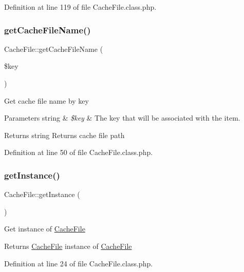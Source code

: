 Definition at line 119 of file Cache\+File.\+class.\+php.

\hypertarget{classCacheFile_a15ca23dea98604dc2e6d067f9ce48242}{}\label{classCacheFile_a15ca23dea98604dc2e6d067f9ce48242} 
\subsubsection{\texorpdfstring{get\+Cache\+File\+Name()}{getCacheFileName()}}
{\footnotesize\ttfamily Cache\+File\+::get\+Cache\+File\+Name (\begin{DoxyParamCaption}\item[{}]{\$key }\end{DoxyParamCaption})}

Get cache file name by key


\begin{DoxyParams}[1]{Parameters}
string & {\em \$key} & The key that will be associated with the item. \\
\hline
\end{DoxyParams}
\begin{DoxyReturn}{Returns}
string Returns cache file path 
\end{DoxyReturn}


Definition at line 50 of file Cache\+File.\+class.\+php.

\hypertarget{classCacheFile_a5389ea809c31aed387c12eb37b2677b8}{}\label{classCacheFile_a5389ea809c31aed387c12eb37b2677b8} 
\subsubsection{\texorpdfstring{get\+Instance()}{getInstance()}}
{\footnotesize\ttfamily Cache\+File\+::get\+Instance (\begin{DoxyParamCaption}{ }\end{DoxyParamCaption})}

Get instance of \hyperlink{classCacheFile}{Cache\+File}

\begin{DoxyReturn}{Returns}
\hyperlink{classCacheFile}{Cache\+File} instance of \hyperlink{classCacheFile}{Cache\+File} 
\end{DoxyReturn}


Definition at line 24 of file Cache\+File.\+class.\+php.

